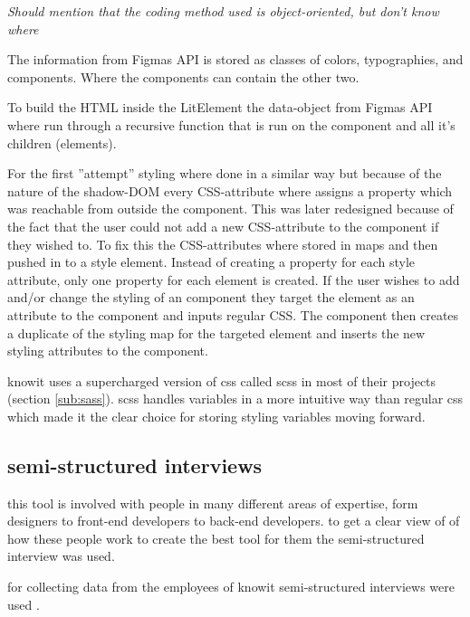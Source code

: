 \textit{Should mention that the coding method used is object-oriented, but don't know where}

The information from Figmas API is stored as classes of colors, typographies, and components. Where the components can contain the other two. 

To build the HTML inside the LitElement the data-object from Figmas API where run through a recursive function that is run on the component and all it's children (elements).

For the first ''attempt'' styling where done in a similar way but because of the nature of the shadow-DOM every CSS-attribute where assigns a property which was reachable from outside the component. This was later redesigned because of the fact that the user could not add a new CSS-attribute to the component if they wished to. To fix this the CSS-attributes where stored in maps \cite{ArrayPrototypeMap} and then pushed in to a style element. Instead of creating a property for each style attribute, only one property for each element is created. If the user wishes to add and/or change the styling of an component they target the element as an attribute to the component and inputs regular CSS. The component then creates a duplicate of the styling map for the targeted element and inserts the new styling attributes to the component.






knowit uses a supercharged version of css called scss in most of their projects (section \ref{sub:sass}). scss handles variables in a more intuitive way than regular  css which made it the clear choice for storing styling variables moving forward.






\subsection{semi-structured interviews}%
\label{sub:inteviews}
this tool is involved with people in many different areas of expertise, form designers to front-end developers to back-end developers. to get a clear view of of how these people work to create the best tool for them the semi-structured interview was used. 

for collecting data from the employees of knowit semi-structured interviews were used \cite{galletta2013mastering}. 





